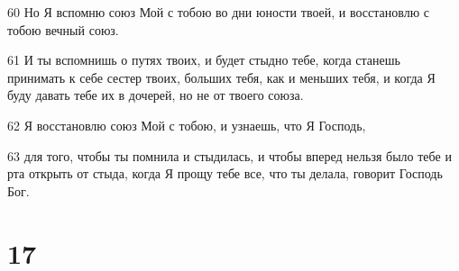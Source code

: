 \par 60 Но Я вспомню союз Мой с тобою во дни юности твоей, и восстановлю с тобою вечный союз.
\par 61 И ты вспомнишь о путях твоих, и будет стыдно тебе, когда станешь принимать к себе сестер твоих, больших тебя, как и меньших тебя, и когда Я буду давать тебе их в дочерей, но не от твоего союза.
\par 62 Я восстановлю союз Мой с тобою, и узнаешь, что Я Господь,
\par 63 для того, чтобы ты помнила и стыдилась, и чтобы вперед нельзя было тебе и рта открыть от стыда, когда Я прощу тебе все, что ты делала, говорит Господь Бог.

\chapter{17}

